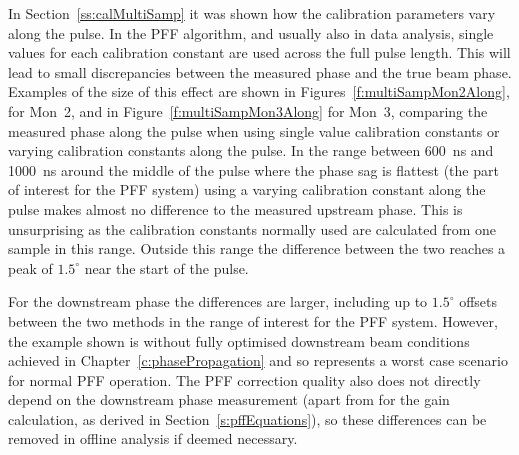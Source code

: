 
In Section~\ref{ss:calMultiSamp} it was shown how the calibration parameters vary along the pulse. In the PFF algorithm, and usually also in data analysis, single values for each calibration constant are used across the full pulse length. This will lead to small discrepancies between the measured phase and the true beam phase. Examples of the size of this effect are shown in Figures~\ref{f:multiSampMon2Along}, for Mon~2, and in Figure~\ref{f:multiSampMon3Along} for Mon~3, comparing the measured phase along the pulse when using single value calibration constants or varying calibration constants along the pulse. In the range between 600~ns and 1000~ns around the middle of the pulse where the phase sag is flattest (the part of interest for the PFF system) using a varying calibration constant along the pulse makes almost no difference to the measured upstream phase. This is unsurprising as the calibration constants normally used are calculated from one sample in this range. Outside this range the difference between the two reaches a peak of \(1.5^\circ\) near the start of the pulse.

For the downstream phase the differences are larger, including up to \(1.5^\circ\) offsets between the two methods in the range of interest for the PFF system. However, the example shown is without fully optimised downstream beam conditions achieved in Chapter~\ref{c:phasePropagation} and so represents a worst case scenario for normal PFF operation. The PFF correction quality also does not directly depend on the downstream phase measurement (apart from for the gain calculation, as derived in Section~\ref{s:pffEquations}), so these differences can be removed in offline analysis if deemed necessary.


